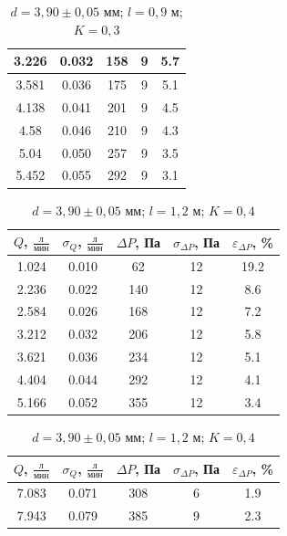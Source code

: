 \documentclass[a4paper,12pt]{article}
\begin{document}
\begin{table}[h!]
\begin{minipage}{0.48\textwidth}
\begin{tabular}{|c|c|c|c|c|}
        3.226 & 0.032 & 158 & 9 & 5.7 \\ \hline
        3.581 & 0.036 & 175 & 9 & 5.1 \\ \hline
        4.138 & 0.041 & 201 & 9 & 4.5 \\ \hline
        4.58 & 0.046 & 210 & 9 & 4.3 \\ \hline
        5.04 & 0.050 & 257 & 9 & 3.5 \\ \hline
        5.452 & 0.055 & 292 & 9 & 3.1 \\ \hline
    \end{tabular}
    \caption{$d = 3,90 \pm 0,05$ мм; $l = 0,9$ м; $K = 0,3$}
\end{minipage}
\end{table}

\begin{table}[h!]
\centering
\begin{minipage}{0.48\textwidth}
\centering
    \begin{tabular}{|c|c|c|c|c|}
        \hline
        $Q$, $\frac{\text{л}}{\text{мин}}$ & $\sigma_Q$, $\frac{\text{л}}{\text{мин}}$  & $\Delta P$, Па & $\sigma_{\Delta P}$, Па & $\varepsilon_{\Delta P}$, \% \\
        \hline
        1.024 & 0.010 & 62 & 12 & 19.2 \\ \hline
        2.236 & 0.022 & 140 & 12 & 8.6 \\ \hline
        2.584 & 0.026 & 168 & 12 & 7.2 \\ \hline
        3.212 & 0.032 & 206 & 12 & 5.8 \\ \hline
        3.621 & 0.036 & 234 & 12 & 5.1 \\ \hline
        4.404 & 0.044 & 292 & 12 & 4.1 \\ \hline
        5.166 & 0.052 & 355 & 12 & 3.4 \\ \hline
    \end{tabular}
    \caption{$d = 3,90 \pm 0,05$ мм; $l = 1,2$ м; $K = 0,4$}
\end{minipage}
\hfill
\begin{minipage}{0.48\textwidth}
\centering
    \begin{tabular}{|c|c|c|c|c|}
        \hline
        $Q$, $\frac{\text{л}}{\text{мин}}$ & $\sigma_Q$, $\frac{\text{л}}{\text{мин}}$  & $\Delta P$, Па & $\sigma_{\Delta P}$, Па & $\varepsilon_{\Delta P}$, \% \\
        \hline
        7.083 & 0.071 & 308 & 6 & 1.9 \\ \hline
        7.943 & 0.079 & 385 & 9 & 2.3 \\ \hline

\end{tabular}
\end{minipage}
\end{table}
\end{document}
